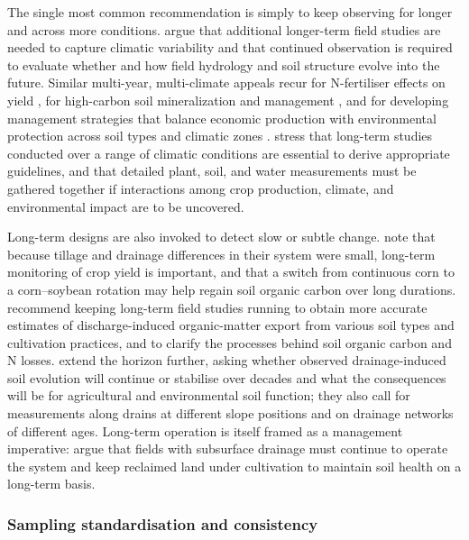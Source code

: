 \documentclass[11pt]{article}
\begin{document}
The single most common recommendation is simply to keep observing for longer and across more conditions. \textcite{Kokulan2019} argue that additional longer-term field studies are needed to capture climatic variability and that continued observation is required to evaluate whether and how field hydrology and soil structure evolve into the future. Similar multi-year, multi-climate appeals recur for N-fertiliser effects on yield \parencite{Kaur2024}, for high-carbon soil mineralization and management \parencite{Waring2022}, and for developing management strategies that balance economic production with environmental protection across soil types and climatic zones \parencite{Kladivko2004}. \textcite{RANDALL1995} stress that long-term studies conducted over a range of climatic conditions are essential to derive appropriate guidelines, and that detailed plant, soil, and water measurements must be gathered together if interactions among crop production, climate, and environmental impact are to be uncovered.

Long-term designs are also invoked to detect slow or subtle change. \textcite{Kumar2014} note that because tillage and drainage differences in their system were small, long-term monitoring of crop yield is important, and that a switch from continuous corn to a corn--soybean rotation may help regain soil organic carbon over long durations. \textcite{Manninen2023} recommend keeping long-term field studies running to obtain more accurate estimates of discharge-induced organic-matter export from various soil types and cultivation practices, and to clarify the processes behind soil organic carbon and N losses. \textcite{Frison2009} extend the horizon further, asking whether observed drainage-induced soil evolution will continue or stabilise over decades and what the consequences will be for agricultural and environmental soil function; they also call for measurements along drains at different slope positions and on drainage networks of different ages. Long-term operation is itself framed as a management imperative: \textcite{Singh2007} argue that fields with subsurface drainage must continue to operate the system and keep reclaimed land under cultivation to maintain soil health on a long-term basis.

\subsubsection{Sampling standardisation and consistency}
\end{document}
